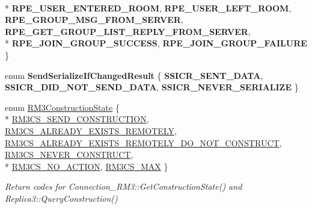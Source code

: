 \begin{DoxyCompactItemize}
\\*
{\bfseries R\-P\-E\-\_\-\-U\-S\-E\-R\-\_\-\-E\-N\-T\-E\-R\-E\-D\-\_\-\-R\-O\-O\-M}, 
{\bfseries R\-P\-E\-\_\-\-U\-S\-E\-R\-\_\-\-L\-E\-F\-T\-\_\-\-R\-O\-O\-M}, 
{\bfseries R\-P\-E\-\_\-\-G\-R\-O\-U\-P\-\_\-\-M\-S\-G\-\_\-\-F\-R\-O\-M\-\_\-\-S\-E\-R\-V\-E\-R}, 
{\bfseries R\-P\-E\-\_\-\-G\-E\-T\-\_\-\-G\-R\-O\-U\-P\-\_\-\-L\-I\-S\-T\-\_\-\-R\-E\-P\-L\-Y\-\_\-\-F\-R\-O\-M\-\_\-\-S\-E\-R\-V\-E\-R}, 
\\*
{\bfseries R\-P\-E\-\_\-\-J\-O\-I\-N\-\_\-\-G\-R\-O\-U\-P\-\_\-\-S\-U\-C\-C\-E\-S\-S}, 
{\bfseries R\-P\-E\-\_\-\-J\-O\-I\-N\-\_\-\-G\-R\-O\-U\-P\-\_\-\-F\-A\-I\-L\-U\-R\-E}
 \}
\item 
enum {\bfseries Send\-Serialize\-If\-Changed\-Result} \{ {\bfseries S\-S\-I\-C\-R\-\_\-\-S\-E\-N\-T\-\_\-\-D\-A\-T\-A}, 
{\bfseries S\-S\-I\-C\-R\-\_\-\-D\-I\-D\-\_\-\-N\-O\-T\-\_\-\-S\-E\-N\-D\-\_\-\-D\-A\-T\-A}, 
{\bfseries S\-S\-I\-C\-R\-\_\-\-N\-E\-V\-E\-R\-\_\-\-S\-E\-R\-I\-A\-L\-I\-Z\-E}
 \}
\item 
enum \hyperlink{group___r_e_p_l_i_c_a___m_a_n_a_g_e_r___g_r_o_u_p3_ga16aaecf3c23582f0de6652b348ccfa38}{R\-M3\-Construction\-State} \{ \\*
\hyperlink{group___r_e_p_l_i_c_a___m_a_n_a_g_e_r___g_r_o_u_p3_gga16aaecf3c23582f0de6652b348ccfa38a508beae91f54ce89c22160c43a608fe1}{R\-M3\-C\-S\-\_\-\-S\-E\-N\-D\-\_\-\-C\-O\-N\-S\-T\-R\-U\-C\-T\-I\-O\-N}, 
\hyperlink{group___r_e_p_l_i_c_a___m_a_n_a_g_e_r___g_r_o_u_p3_gga16aaecf3c23582f0de6652b348ccfa38a830fdf9eb729456bb62c8f3116afe260}{R\-M3\-C\-S\-\_\-\-A\-L\-R\-E\-A\-D\-Y\-\_\-\-E\-X\-I\-S\-T\-S\-\_\-\-R\-E\-M\-O\-T\-E\-L\-Y}, 
\hyperlink{group___r_e_p_l_i_c_a___m_a_n_a_g_e_r___g_r_o_u_p3_gga16aaecf3c23582f0de6652b348ccfa38a526a86138ec25d79d3981860bd09d4e3}{R\-M3\-C\-S\-\_\-\-A\-L\-R\-E\-A\-D\-Y\-\_\-\-E\-X\-I\-S\-T\-S\-\_\-\-R\-E\-M\-O\-T\-E\-L\-Y\-\_\-\-D\-O\-\_\-\-N\-O\-T\-\_\-\-C\-O\-N\-S\-T\-R\-U\-C\-T}, 
\hyperlink{group___r_e_p_l_i_c_a___m_a_n_a_g_e_r___g_r_o_u_p3_gga16aaecf3c23582f0de6652b348ccfa38a7340e8e1ecf573595a196376ac02eb3c}{R\-M3\-C\-S\-\_\-\-N\-E\-V\-E\-R\-\_\-\-C\-O\-N\-S\-T\-R\-U\-C\-T}, 
\\*
\hyperlink{group___r_e_p_l_i_c_a___m_a_n_a_g_e_r___g_r_o_u_p3_gga16aaecf3c23582f0de6652b348ccfa38a28922f257ecef864a4490ec6aae6a48b}{R\-M3\-C\-S\-\_\-\-N\-O\-\_\-\-A\-C\-T\-I\-O\-N}, 
\hyperlink{group___r_e_p_l_i_c_a___m_a_n_a_g_e_r___g_r_o_u_p3_gga16aaecf3c23582f0de6652b348ccfa38afd4d901f7fd70e9fa64c911d427a14a0}{R\-M3\-C\-S\-\_\-\-M\-A\-X}
 \}
\begin{DoxyCompactList}\small\item\em Return codes for Connection\-\_\-\-R\-M3\-::\-Get\-Construction\-State() and Replica3\-::\-Query\-Construction() \end{DoxyCompactList}\item 

\end{DoxyCompactItemize}

